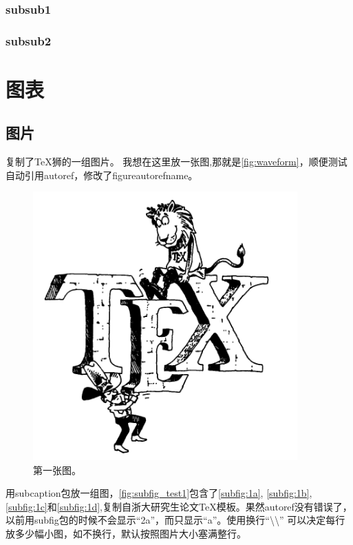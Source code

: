 \documentclass{myreport}
\begin{document}
\subsubsection{subsub1}
\subsubsection{subsub2}

\section{图表}
\subsection{图片}
复制了TeX狮的一组图片。
我想在这里放一张图,那就是\autoref{fig:waveform}，顺便测试自动引用autoref，修改了figureautorefname。
\begin{figure}[htbp]
\centering
\includegraphics[width=4in]{Chapter1}
\caption{第一张图。}
\label{fig:waveform}
\end{figure}

用subcaption包放一组图，\autoref{fig:subfig_test1}包含了\autoref{subfig:1a}, \autoref{subfig:1b},\autoref{subfig:1c}和\autoref{subfig:1d},复制自浙大研究生论文TeX模板。果然autoref没有错误了，以前用subfig包的时候不会显示“2a”，而只显示“a”。使用换行“\textbackslash\textbackslash” 可以决定每行放多少幅小图，如不换行，默认按照图片大小塞满整行。
\end{document}
